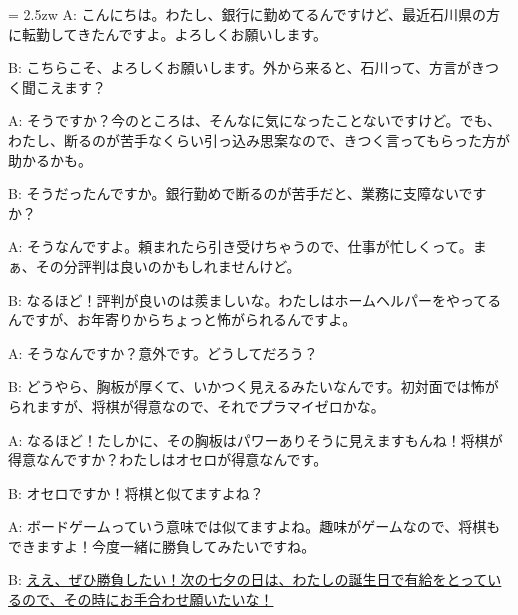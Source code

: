 \documentclass[11pt]{amsart}
\title{}
\author{}
\newenvironment{hangall}[1]{\hangindent = 2.5zw\everypar{\hangindent = 2.5zw}}{}
\begin{document}
\maketitle
\begin{hangall}{}%
A: こんにちは。わたし、銀行に勤めてるんですけど、最近石川県の方に転勤してきたんですよ。よろしくお願いします。

B: こちらこそ、よろしくお願いします。外から来ると、石川って、方言がきつく聞こえます？

A: そうですか？今のところは、そんなに気になったことないですけど。でも、わたし、断るのが苦手なくらい引っ込み思案なので、きつく言ってもらった方が助かるかも。

B: そうだったんですか。銀行勤めで断るのが苦手だと、業務に支障ないですか？

A: そうなんですよ。頼まれたら引き受けちゃうので、仕事が忙しくって。まぁ、その分評判は良いのかもしれませんけど。

B: なるほど！評判が良いのは羨ましいな。わたしはホームヘルパーをやってるんですが、お年寄りからちょっと怖がられるんですよ。

A: そうなんですか？意外です。どうしてだろう？

B: どうやら、胸板が厚くて、いかつく見えるみたいなんです。初対面では怖がられますが、将棋が得意なので、それでプラマイゼロかな。

A: なるほど！たしかに、その胸板はパワーありそうに見えますもんね！将棋が得意なんですか？わたしはオセロが得意なんです。

B: オセロですか！将棋と似てますよね？

A: ボードゲームっていう意味では似てますよね。趣味がゲームなので、将棋もできますよ！今度一緒に勝負してみたいですね。

B: \ul{ええ、ぜひ勝負したい！次の七夕の日は、わたしの誕生日で有給をとっているので、その時にお手合わせ願いたいな！}\end{hangall}
\end{document}
